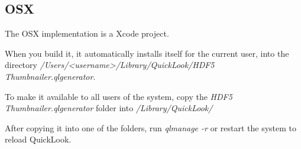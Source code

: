 \subsection{OSX}

The OSX implementation is a Xcode project.

When you build it, it automatically installs itself for the current user, into the directory
\emph{/Users/<username>/Library/QuickLook/HDF5 Thumbnailer.qlgenerator}.

To make it available to all users of the system, copy the \emph{HDF5 Thumbnailer.qlgenerator} folder into
\emph{/Library/QuickLook/}

After copying it into one of the folders, run \emph{qlmanage -r} or restart the system to reload QuickLook.